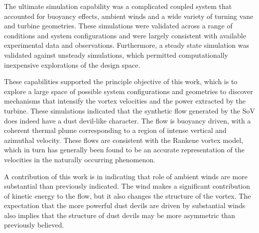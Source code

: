 The ultimate simulation capability was a complicated coupled system that
accounted for buoyancy effects, ambient winds and a wide variety of
turning vane and turbine geometries. These simulations were validated
across a range of conditions and system configurations and were largely
consistent with available experimental data and
observations. Furthermore, a steady state simulation was validated
against unsteady simulations, which permitted computationally
inexpensive explorations of the design space. 




These capabilities supported the principle objective of this work, which
is to explore a large space of possible system configurations and
geometries to discover mechanisms that intensify the vortex velocities
and the power extracted by the turbine. These simulations indicated that
the synthetic flow generated by the SoV does indeed have a dust
devil-like character. The flow is buoyancy driven, with a coherent
thermal plume corresponding to a region of intense vertical and
azimuthal velocity. These flows are consistent with the Rankene
vortex model, which in turn has generally been found to be an accurate
representation of the velocities in the naturally occurring phenomenon. 

A contribution of this work is in indicating that role of
ambient winds are more substantial than previously indicated. The wind
makes a significant contribution of kinetic energy to the flow, but it
also changes the structure of the vortex. The expectation that the more
powerful dust devils are driven by substantial winds also implies that
the structure of dust devils may be more asymmetric than previously believed. 



